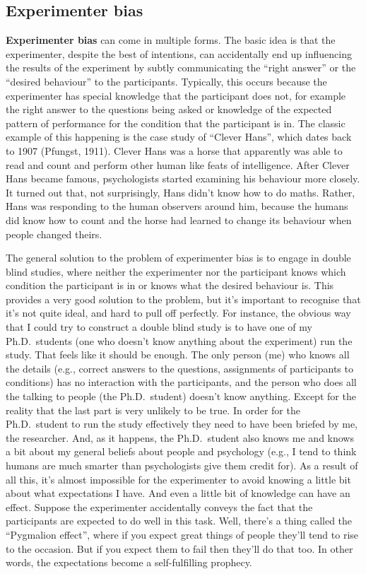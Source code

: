 \documentclass[
  a4paper,
]{book}
\begin{document}
\hypertarget{experimenter-bias}{%
\subsection{Experimenter bias}\label{experimenter-bias}}

\textbf{Experimenter bias} can come in multiple forms. The basic idea is
that the experimenter, despite the best of intentions, can accidentally
end up influencing the results of the experiment by subtly communicating
the ``right answer'' or the ``desired behaviour'' to the participants.
Typically, this occurs because the experimenter has special knowledge
that the participant does not, for example the right answer to the
questions being asked or knowledge of the expected pattern of
performance for the condition that the participant is in. The classic
example of this happening is the case study of ``Clever Hans'', which
dates back to 1907 (Pfungst, 1911). Clever Hans was a horse that
apparently was able to read and count and perform other human like feats
of intelligence. After Clever Hans became famous, psychologists started
examining his behaviour more closely. It turned out that, not
surprisingly, Hans didn't know how to do maths. Rather, Hans was
responding to the human observers around him, because the humans did
know how to count and the horse had learned to change its behaviour when
people changed theirs.

The general solution to the problem of experimenter bias is to engage in
double blind studies, where neither the experimenter nor the participant
knows which condition the participant is in or knows what the desired
behaviour is. This provides a very good solution to the problem, but
it's important to recognise that it's not quite ideal, and hard to pull
off perfectly. For instance, the obvious way that I could try to
construct a double blind study is to have one of my Ph.D.~students (one
who doesn't know anything about the experiment) run the study. That
feels like it should be enough. The only person (me) who knows all the
details (e.g., correct answers to the questions, assignments of
participants to conditions) has no interaction with the participants,
and the person who does all the talking to people (the Ph.D.~student)
doesn't know anything. Except for the reality that the last part is very
unlikely to be true. In order for the Ph.D.~student to run the study
effectively they need to have been briefed by me, the researcher. And,
as it happens, the Ph.D.~student also knows me and knows a bit about my
general beliefs about people and psychology (e.g., I tend to think
humans are much smarter than psychologists give them credit for). As a
result of all this, it's almost impossible for the experimenter to avoid
knowing a little bit about what expectations I have. And even a little
bit of knowledge can have an effect. Suppose the experimenter
accidentally conveys the fact that the participants are expected to do
well in this task. Well, there's a thing called the ``Pygmalion
effect'', where if you expect great things of people they'll tend to
rise to the occasion. But if you expect them to fail then they'll do
that too. In other words, the expectations become a self-fulfilling
prophecy.
\end{document}

